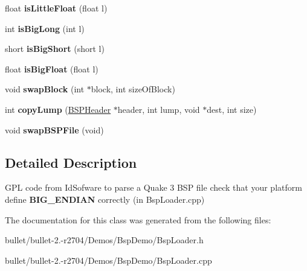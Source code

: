 \begin{DoxyCompactItemize}
\item 
\hypertarget{class_bsp_loader_a39f5047fce412d2b69c697aaf2508ca9}{float {\bfseries is\+Little\+Float} (float l)}\label{class_bsp_loader_a39f5047fce412d2b69c697aaf2508ca9}

\item 
\hypertarget{class_bsp_loader_a360982d0db12b67fe078e693118c2c5c}{int {\bfseries is\+Big\+Long} (int l)}\label{class_bsp_loader_a360982d0db12b67fe078e693118c2c5c}

\item 
\hypertarget{class_bsp_loader_a17998211e9e68f6690a5d9c96c5a95f3}{short {\bfseries is\+Big\+Short} (short l)}\label{class_bsp_loader_a17998211e9e68f6690a5d9c96c5a95f3}

\item 
\hypertarget{class_bsp_loader_aa0845df21084453a820a151cb3718928}{float {\bfseries is\+Big\+Float} (float l)}\label{class_bsp_loader_aa0845df21084453a820a151cb3718928}

\item 
\hypertarget{class_bsp_loader_aafdee263fb928f37eeb49021c4ece7f6}{void {\bfseries swap\+Block} (int $\ast$block, int size\+Of\+Block)}\label{class_bsp_loader_aafdee263fb928f37eeb49021c4ece7f6}

\item 
\hypertarget{class_bsp_loader_a3cdd68e8c494aaa1e06ced3423751678}{int {\bfseries copy\+Lump} (\hyperlink{struct_b_s_p_header}{B\+S\+P\+Header} $\ast$header, int lump, void $\ast$dest, int size)}\label{class_bsp_loader_a3cdd68e8c494aaa1e06ced3423751678}

\item 
\hypertarget{class_bsp_loader_a6acd8af47623886dbcc0acce1ac4cbde}{void {\bfseries swap\+B\+S\+P\+File} (void)}\label{class_bsp_loader_a6acd8af47623886dbcc0acce1ac4cbde}

\end{DoxyCompactItemize}


\subsection{Detailed Description}
G\+P\+L code from Id\+Sofware to parse a Quake 3 B\+S\+P file check that your platform define {\bfseries B\+I\+G\+\_\+\+E\+N\+D\+I\+A\+N} correctly (in Bsp\+Loader.\+cpp) 

The documentation for this class was generated from the following files\+:\begin{DoxyCompactItemize}
\item 
bullet/bullet-\/2.-\/r2704/\+Demos/\+Bsp\+Demo/Bsp\+Loader.\+h\item 
bullet/bullet-\/2.-\/r2704/\+Demos/\+Bsp\+Demo/Bsp\+Loader.\+cpp\end{DoxyCompactItemize}

